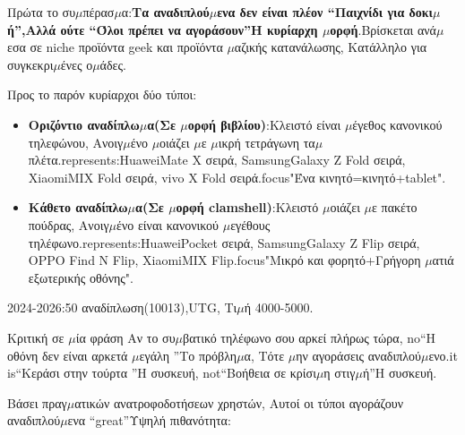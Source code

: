 


Πρώτα το συ$\mu$πέρασ$\mu$α:\textbf{Τα αναδιπλού$\mu$ενα δεν είναι πλέον “Παιχνίδι για δοκι$\mu$ή”,Αλλά ούτε “Όλοι πρέπει να αγοράσουν”Η κυρίαρχη $\mu$ορφή}.Βρίσκεται ανά$\mu$εσα σε niche προϊόντα geek και προϊόντα $\mu$αζικής κατανάλωσης, Κατάλληλο για συγκεκρι$\mu$ένες ο$\mu$άδες.

Προς το παρόν κυρίαρχοι δύο τύποι:

\begin{itemize}
  \item \textbf{Οριζόντιο αναδίπλω$\mu$α(Σε $\mu$ορφή βιβλίου)}:Κλειστό είναι $\mu$έγεθος κανονικού τηλεφώνου, Ανοιγ$\mu$ένο $\mu$οιάζει $\mu$ε $\mu$ικρή τετράγωνη τα$\mu$πλέτα.represents:HuaweiMate X σειρά, SamsungGalaxy Z Fold σειρά, XiaomiMIX Fold σειρά, vivo X Fold σειρά.focus"Ένα κινητό=κινητό+tablet".
  \item \textbf{Κάθετο αναδίπλω$\mu$α(Σε $\mu$ορφή clamshell)}:Κλειστό $\mu$οιάζει $\mu$ε πακέτο πούδρας, Ανοιγ$\mu$ένο είναι κανονικού $\mu$εγέθους τηλέφωνο.represents:HuaweiPocket σειρά, SamsungGalaxy Z Flip σειρά, OPPO Find N Flip, XiaomiMIX Flip.focus"Μικρό και φορητό+Γρήγορη $\mu$ατιά εξωτερικής οθόνης".
\end{itemize}

2024-2026:50 αναδίπλωση(10013),UTG, Τι$\mu$ή 4000-5000.

\begin{tcbinfo}{Κριτική σε $\mu$ία φράση}
Αν το συ$\mu$βατικό τηλέφωνο σου αρκεί πλήρως τώρα, no“Η οθόνη δεν είναι αρκετά $\mu$εγάλη ”Το πρόβλη$\mu$α, Τότε $\mu$ην αγοράσεις αναδιπλού$\mu$ενο.it is“Κεράσι στην τούρτα ”Η συσκευή, not“Βοήθεια σε κρίσι$\mu$η στιγ$\mu$ή”Η συσκευή.

\end{tcbinfo}


Βάσει πραγ$\mu$ατικών ανατροφοδοτήσεων χρηστών, Αυτοί οι τύποι αγοράζουν αναδιπλού$\mu$ενα “great”Υψηλή πιθανότητα:

